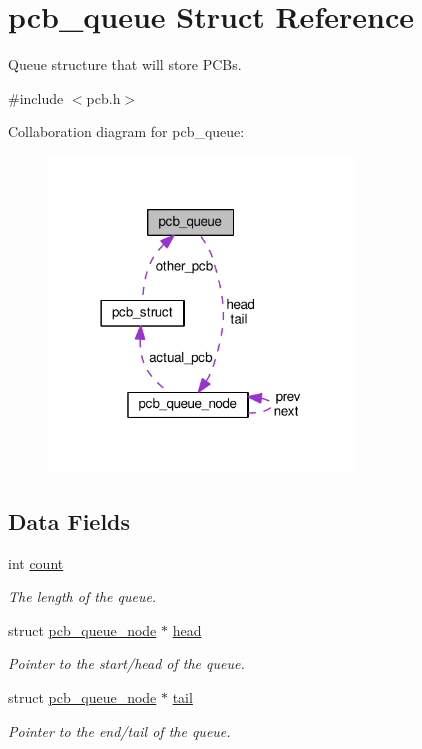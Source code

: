 \hypertarget{structpcb__queue}{}\section{pcb\+\_\+queue Struct Reference}
\label{structpcb__queue}


Queue structure that will store P\+C\+Bs.  




{\ttfamily \#include $<$pcb.\+h$>$}



Collaboration diagram for pcb\+\_\+queue\+:\nopagebreak
\begin{figure}[H]
\begin{center}
\leavevmode
\includegraphics[width=230pt]{structpcb__queue__coll__graph}
\end{center}
\end{figure}
\subsection*{Data Fields}
\begin{DoxyCompactItemize}
\item 
int \hyperlink{structpcb__queue_a04e6c9d91e324b1f6cbc8bfd771bafb1}{count}
\begin{DoxyCompactList}\small\item\em The length of the queue. \end{DoxyCompactList}\item 
struct \hyperlink{structpcb__queue__node}{pcb\+\_\+queue\+\_\+node} $\ast$ \hyperlink{structpcb__queue_a183818f26c833aa30aefac583db68388}{head}
\begin{DoxyCompactList}\small\item\em Pointer to the start/head of the queue. \end{DoxyCompactList}\item 
struct \hyperlink{structpcb__queue__node}{pcb\+\_\+queue\+\_\+node} $\ast$ \hyperlink{structpcb__queue_a54ed164636944248130e7032b7786cb3}{tail}
\begin{DoxyCompactList}\small\item\em Pointer to the end/tail of the queue. \end{DoxyCompactList}\end{DoxyCompactItemize}


